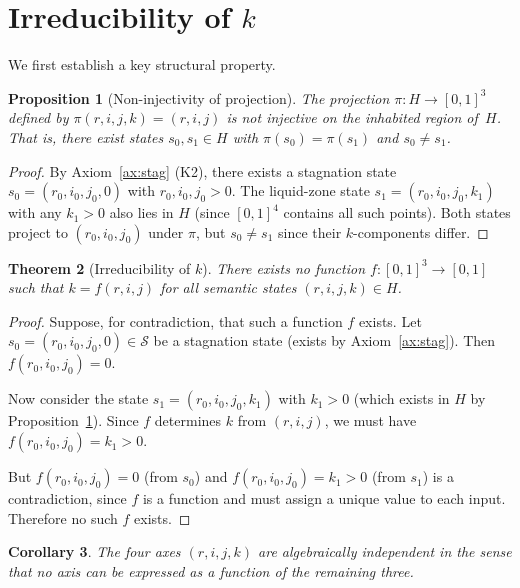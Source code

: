 \documentclass[11pt,a4paper]{article}
\newtheorem{theorem}{Theorem}
\newtheorem{proposition}[theorem]{Proposition}
\newtheorem{corollary}[theorem]{Corollary}
\newcommand{\rey}[1]{{\color{rcolor}#1}}
\newcommand{\imag}[1]{{\color{icolor}#1}}
\newcommand{\exac}[1]{{\color{jcolor}#1}}
\newcommand{\recu}[1]{{\color{kcolor}#1}}
\def\rey#1{#1}%
\def\imag#1{#1}%
\def\exac#1{#1}%
\def\recu#1{#1}%
\begin{document}
\section{Irreducibility of \texorpdfstring{$\recu{k}$}{k}}
\label{sec:irred}

We first establish a key structural property.

\begin{proposition}[Non-injectivity of projection]
\label{prop:noninj}
The projection $\pi: H \to [0,1]^3$ defined by $\pi(r,i,j,k) =
(r,i,j)$ is not injective on the inhabited region of~$H$. That is,
there exist states $s_0, s_1 \in H$ with $\pi(s_0) = \pi(s_1)$ and
$s_0 \neq s_1$.
\end{proposition}

\begin{proof}
By Axiom~\ref{ax:stag} (K2), there exists a stagnation state $s_0 =
(r_0, i_0, j_0, 0)$ with $r_0, i_0, j_0 > 0$. The liquid-zone state
$s_1 = (r_0, i_0, j_0, k_1)$ with any $k_1 > 0$ also lies in $H$
(since $[0,1]^4$ contains all such points). Both states project to
$(r_0, i_0, j_0)$ under $\pi$, but $s_0 \neq s_1$ since their
$\recu{k}$-components differ.
\end{proof}

\begin{theorem}[Irreducibility of $\recu{k}$]
\label{thm:irred}
There exists no function $f: [0,1]^3 \to [0,1]$ such that
$k = f(r, i, j)$ for all semantic states $(r, i, j, k) \in H$.
\end{theorem}

\begin{proof}
Suppose, for contradiction, that such a function $f$ exists. Let
$s_0 = (r_0, i_0, j_0, 0) \in \mathcal{S}$ be a stagnation state
(exists by Axiom~\ref{ax:stag}). Then $f(r_0, i_0, j_0) = 0$.

Now consider the state $s_1 = (r_0, i_0, j_0, k_1)$ with $k_1 > 0$
(which exists in $H$ by Proposition~\ref{prop:noninj}). Since $f$
determines $k$ from $(r,i,j)$, we must have $f(r_0, i_0, j_0) = k_1 >
0$.

But $f(r_0, i_0, j_0) = 0$ (from $s_0$) and $f(r_0, i_0, j_0) = k_1
> 0$ (from $s_1$) is a contradiction, since $f$ is a function and must
assign a unique value to each input. Therefore no such $f$ exists.
\end{proof}

\begin{corollary}
\label{cor:independence}
The four axes $(\rey{r}, \imag{i}, \exac{j}, \recu{k})$ are
algebraically independent in the sense that no axis can be expressed as
a function of the remaining three.
\end{corollary}
\end{document}
